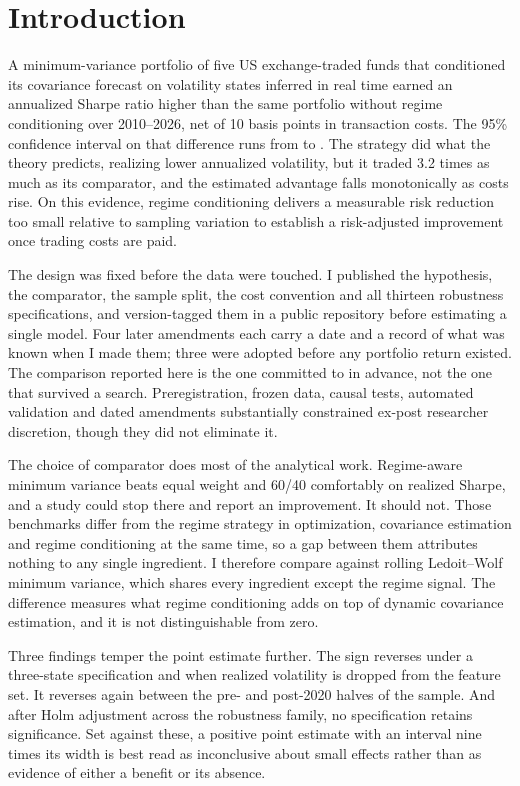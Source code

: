 \section{Introduction}
\label{sec:introduction}

A minimum-variance portfolio of five US exchange-traded funds that
conditioned its covariance forecast on volatility states inferred in
real time earned an annualized Sharpe ratio \primarySharpeDiff{} higher
than the same portfolio without regime conditioning over 2010--2026, net
of 10 basis points in transaction costs. The 95\% confidence interval on
that difference runs from \primaryCiLower{} to \primaryCiUpper{}. The
strategy did what the theory predicts, realizing \volDifference{} lower
annualized volatility, but it traded 3.2 times as much as its
comparator, and the estimated advantage falls monotonically as costs
rise. On this evidence, regime conditioning delivers a measurable risk
reduction too small relative to sampling variation to establish a
risk-adjusted improvement once trading costs are paid.

The design was fixed before the data were touched. I published the
hypothesis, the comparator, the sample split, the cost convention and
all thirteen robustness specifications, and version-tagged them in a
public repository before estimating a single model. Four later
amendments each carry a date and a record of what was known when I made
them; three were adopted before any portfolio return existed. The
comparison reported here is the one committed to in advance, not the one
that survived a search. Preregistration, frozen data, causal tests,
automated validation and dated amendments substantially constrained
ex-post researcher discretion, though they did not eliminate it.

The choice of comparator does most of the analytical work. Regime-aware
minimum variance beats equal weight and 60/40 comfortably on realized
Sharpe, and a study could stop there and report an improvement. It
should not. Those benchmarks differ from the regime strategy in
optimization, covariance estimation and regime conditioning at the same
time, so a gap between them attributes nothing to any single ingredient.
I therefore compare against rolling Ledoit--Wolf minimum variance, which
shares every ingredient except the regime signal. The \primarySharpeDiff{}
difference measures what regime conditioning adds on top of dynamic
covariance estimation, and it is not distinguishable from zero.

Three findings temper the point estimate further. The sign reverses
under a three-state specification and when realized volatility is
dropped from the feature set. It reverses again between the pre- and
post-2020 halves of the sample. And after Holm adjustment across the
robustness family, no specification retains significance. Set against
these, a positive point estimate with an interval nine times its width
is best read as inconclusive about small effects rather than as evidence
of either a benefit or its absence.

